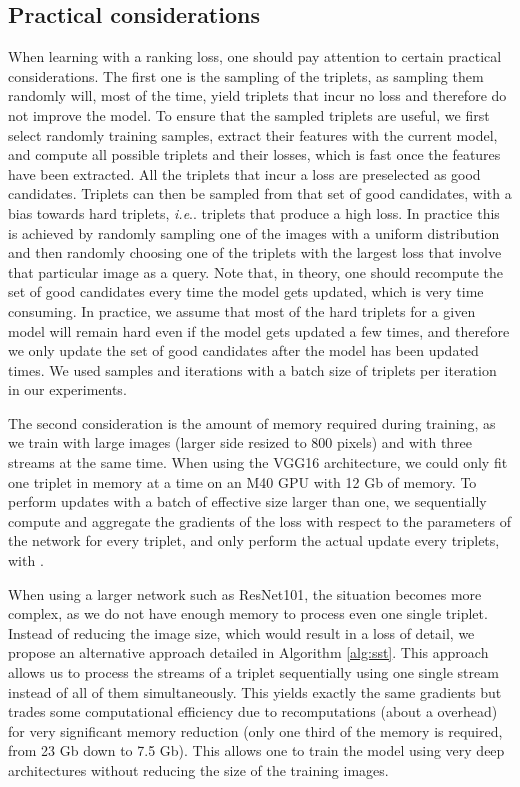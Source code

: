 \documentclass[twocolumn]{svjour3}          \smartqed  \usepackage{graphicx}
\makeatletter
\DeclareRobustCommand\onedot{\futurelet\@let@token\@onedot}
\def\@onedot{\ifx\@let@token.\else.\null\fi\xspace}
\def\ie{\emph{i.e}\onedot} \def\Ie{\emph{I.e}\onedot}
\makeatother
\begin{document}
\subsection{Practical considerations}
\label{sec:deeper}
When learning with a ranking loss, one should pay attention to certain practical considerations.
The first one is the sampling of the triplets, as sampling them randomly will, most of the time, yield triplets that incur no loss and therefore do not improve the model.
To ensure that the sampled triplets are useful, we first select randomly  training samples, extract their features with the current model, and compute all possible triplets and their losses, which is fast once the features have been extracted. All the triplets that incur a loss are preselected as good candidates. Triplets can then be sampled from that set of good candidates, with a bias towards hard triplets, \ie triplets that produce a high loss.
In practice this is achieved by randomly sampling one of the  images with a uniform distribution and then randomly choosing one of the  triplets with the largest loss that involve that particular image as a query. 
Note that, in theory, one should recompute the set of good candidates every time the model gets updated, which is very time consuming. In practice, we assume that most of the hard triplets for a given model will remain hard even if the model gets updated a few times, and therefore we only update the set of good candidates after the model has been updated  times. We used   samples and  iterations with a batch size of  triplets per iteration in our experiments.

The second consideration is the amount of memory required during training, as we train with large images (larger side resized to 800 pixels) and with three streams at the same time. When using the VGG16 architecture, we could only fit one triplet in memory at a time on an M40 GPU with 12 Gb of memory. To perform updates with a batch of effective size  larger than one, we sequentially compute and aggregate the gradients of the loss with respect to the parameters of the network for every triplet, and only perform the actual update every  triplets, with .

When using a larger network such as ResNet101, the situation becomes more complex, as we do not have enough memory to process even one single triplet. Instead of reducing the image size, which would result in a loss of detail, we propose an alternative approach detailed in Algorithm \ref{alg:sst}. This approach allows us to process the streams of a triplet sequentially using one single stream instead of all of them simultaneously. This yields exactly the same gradients but trades some computational efficiency due to recomputations (about a  overhead) for very significant memory reduction (only one third of the memory is required, from 23 Gb down to 7.5 Gb). This allows one to train the model using very deep architectures without reducing the size of the training images.
\end{document}
